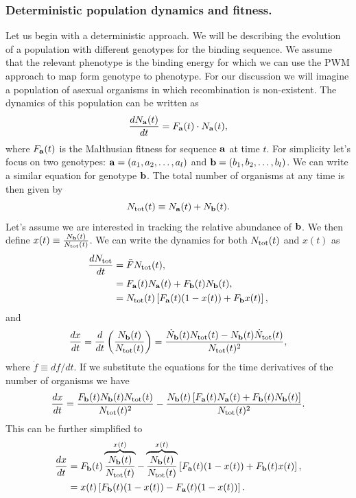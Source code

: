 \subsubsection{Deterministic population dynamics and fitness.}

Let us begin with a deterministic approach. We will be describing the evolution
of a population with different genotypes for the binding sequence. We assume
that the relevant phenotype is the binding energy for which we can use the PWM
approach to map form genotype to phenotype. For our discussion we will imagine
a population of asexual organisms in which recombination is non-existent.
The dynamics of this population can be written as
\begin{equation}
  {d{N_{\mathbf{a}}(t)} \over dt} = F_{\mathbf{a}}(t) \cdot N_{\mathbf{a}}(t),
\end{equation}
where $F_{\mathbf{a}}(t)$ is the Malthusian fitness for sequence $\mathbf{a}$ at time $t$.
For simplicity let's focus on two genotypes: $\mathbf{a} = (a_1, a_2, \ldots, a_l)$
and $\mathbf{b} = (b_1, b_2, \ldots, b_l)$. We can write a similar equation for
genotype $\mathbf{b}$. The total number of organisms at any time is then given by
\begin{equation}
  N_{\text{tot}}(t) \equiv N_{\mathbf{a}}(t) + N_{\mathbf{b}}(t).
\end{equation}
Let's assume we are interested in tracking the relative abundance of $\mathbf{b}$.
We then define $x(t) \equiv {N_{\mathbf{b}}(t) \over N_{\text{tot}}(t)}$. We can write the
dynamics for both $N_{\text{tot}}(t)$ and $x(t)$ as
\begin{align}
{d{N_{\text{tot}}} \over dt} &= \bar{F} N_{\text{tot}}(t),\\
&= F_{\mathbf{a}}(t) N_{\mathbf{a}}(t) + F_{\mathbf{b}}(t) N_{\mathbf{b}}(t),\\
&= N_{\text{tot}}(t) \left[ F_{\mathbf{a}}(t) (1 - x(t)) + F_{\mathbf{b}} x(t) \right],
\end{align}
and
\begin{equation}
  {d{x} \over dt} = {d \over dt} \left( {N_{\mathbf{b}}(t) \over N_{\text{tot}}(t)} \right)
  = {\dot{N}_{\mathbf{b}}(t) N_{\text{tot}}(t) - N_{\mathbf{b}}(t) \dot{N}_{\text{tot}}(t) \over
     N_{\text{tot}}(t)^2},
\end{equation}
where $\dot{f} \equiv df/dt$. If we substitute the equations for the time
derivatives of the number of organisms we have
\begin{equation}
  {d{x} \over dt} = {F_{\mathbf{b}}(t) N_{\mathbf{b}}(t) N_{\text{tot}}(t) \over N_{\text{tot}}(t)^2} -
  {N_{\mathbf{b}}(t) \left[ F_{\mathbf{a}}(t)N_{\mathbf{a}}(t) + F_{\mathbf{b}}(t)N_{\mathbf{b}}(t) \right]
  \over N_{\text{tot}}(t)^2}.
\end{equation}
This can be further simplified to
\begin{align}
  {d{x} \over dt} &= F_{\mathbf{b}}(t) \overbrace{N_{\mathbf{b}}(t) \over N_{\text{tot}}(t)}^{x(t)} -
  \overbrace{N_{\mathbf{b}}(t) \over N_{\text{tot}}(t)}^{x(t)}
  \left[ F_{\mathbf{a}}(t) (1 - x(t)) + F_{\mathbf{b}}(t) x(t) \right],\\
  &= x(t) \left[ F_{\mathbf{b}}(t) (1 - x(t)) - F_{\mathbf{a}}(t) (1 - x(t)) \right].
\end{align}

